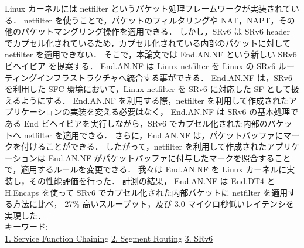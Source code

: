 Linux カーネルには netfilter というパケット処理フレームワークが実装されている．
netfilter を使うことで，パケットのフィルタリングや NAT，NAPT，その他のパケットマングリング操作を適用できる．
しかし，SRv6 は SRv6 header でカプセル化されているため，カプセル化されている内部のパケットに対して netfilter を適用できない．
そこで，本論文では End.AN.NF という新しい SRv6 ビヘイビア を提案する．
End.AN.NF は Linux netfilter を Linux の SRv6 ルーティングインフラストラクチャへ統合する事ができる．
End.AN.NF は，SRv6 を利用した SFC 環境において，Linux netfilter を SRv6 に対応した SF として扱えるようにする．
End.AN.NF を利用する際，netfilter を利用して作成されたアプリケーションの実装を変える必要はなく，
End.AN.NF は SRv6 の基本処理である End ビヘイビアを実行しながら，SRv6 でカプセル化された内部のパケットへ netfilter を適用できる．
さらに，End.AN.NF は，パケットバッファにマークを付けることができる．
したがって，netfilter を利用して作成されたアプリケーションは End.AN.NF がパケットバッファに付与したマークを照合することで，適用するルールを変更できる．
我々は End.AN.NF を Linux カーネルに実装し，その性能評価を行った．
計測の結果， End.AN.NF は End.DT4 と H.Encaps を使って SRv6 でカプセル化された内部パケットに netfilter を適用する方法に比べ，
27\% 高いスループット，及び 3.0 マイクロ秒低いレイテンシを実現した．
~ \\
キーワード:\\
\underline{1. Service Function Chaining}
\underline{2. Segment Routing}
\underline{3. SRv6}
\begin{flushright}
\dept \\
\author
\end{flushright}
